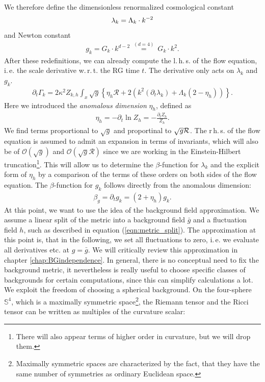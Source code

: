 We therefore define the dimensionless renormalized cosmological constant 
\begin{align}
	\lambda_k = \Lambda_k\cdot k^{-2}
\end{align}
and Newton constant
\begin{align}
	g_k = G_k\cdot k^{d-2} \ \overset{(d=4)}{=} \ G_k\cdot k^{2}.
\end{align}
After these redefinitions, we can already compute the l.\,h.\,s. of the flow equation, i.\,e. the scale derivative w.\,r.\,t. the RG time $t$. The derivative only acts on $\lambda_k$ and $g_k$.
\begin{align}
	\partial_{t}\Gamma_{k} = 2\kappa^2 Z_{k,h}\int_x \sqrt{g} \left\{\eta_h\mathcal{R}+2\left(k^2(\partial_t\lambda_k) + \Lambda_k(2 - \eta_h)\right)\right\}.
\end{align}
Here we introduced the \textit{anomalous dimension} $\eta_h$, defined as
\begin{align}
	\eta_h=-\partial_t \ln Z_h = -\frac{\partial_tZ_h}{Z_h}.
\end{align} 
We find terms proportional to $\sqrt{g}$ and proportinal to $\sqrt{g}\mathcal{R}$. The r\,h.\,s. of the flow equation is assumed to admit an expansion in terms of invariants, which will also be of $\mathcal{O}\left(\sqrt{g}\right)$ and  $\mathcal{O}\left(\sqrt{g}\mathcal{R}\right)$ since we are working in the Einstein-Hilbert truncation\footnote{There will also appear terms of higher order in curvature, but we will drop them.}. This will allow us to determine the $\beta$-function for $\lambda_k$ and the explicit form of $\eta_h$ by a comparison of the terms of these orders on both sides of the flow equation.
The $\beta$-function for $g_k$ follows directly from the anomalous dimension:
\begin{align}
	\beta_g = \partial_t g_k = \left(2 + \eta_h\right)g_k.
\end{align}
At this point, we want to use the idea of the background field approximation. We assume a linear split of the metric into a background field $\bar{g}$ and a fluctuation field $h$, such as described in  equation (\ref{eqn:metric_split}). The approximation at this point is, that in the following, we set all fluctuations to zero, i.\,e. we evaluate all derivatives etc. at $g=\bar{g}$. We will critically review this approximation in chapter \ref{chap:BGindependence}. In general, there is no conceptual need to fix the background metric, it nevertheless is really useful to choose specific classes of backgrounds for certain computations, since this can simplify calculations a lot. We exploit the freedom of choosing a spherical background. On the four-sphere $\mathbb{S}^4$, which is a maximally symmetric space\footnote{Maximally symmetric spaces are characterized by the fact, that they have the same number of symmetries as ordinary Euclidean space.}, the Riemann tensor and the Ricci tensor can be written as multiples of the curvature scalar:
